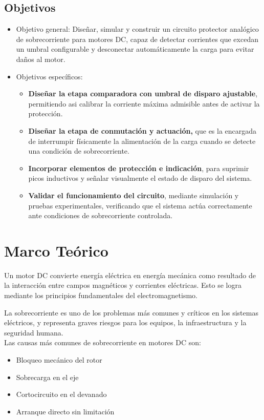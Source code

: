 \documentclass[conference]{IEEEtran}
\begin{document}
\subsection{Objetivos}
\begin{itemize}
    \item Objetivo general: Diseñar, simular y construir un circuito protector analógico de sobrecorriente para motores DC, capaz de detectar corrientes que excedan un umbral configurable y desconectar automáticamente la carga para evitar daños al motor.\\
    \item Objetivos específicos:
    \begin{itemize}
        \item \textbf{Diseñar la etapa comparadora con umbral de disparo ajustable}, permitiendo asi calibrar la corriente máxima admisible antes de activar la protección.
        \item \textbf{Diseñar la etapa de conmutación y actuación,} que es la encargada de interrumpir físicamente la alimentación de la carga cuando se detecte una condición de sobrecorriente.
        \item \textbf{Incorporar elementos de protección e indicación}, para suprimir picos inductivos y señalar visualmente el estado de disparo del sistema.
        \item \textbf{Validar el funcionamiento del circuito}, mediante simulación y pruebas experimentales, verificando que el sistema actúa correctamente ante condiciones de sobrecorriente controlada.
    \end{itemize}
\end{itemize}

\section{Marco Teórico}

Un motor DC convierte energía eléctrica en energía mecánica como resultado de la interacción entre campos magnéticos y corrientes eléctricas. Esto se logra mediante los principios fundamentales del electromagnetismo.

La sobrecorriente es uno de los problemas más comunes y críticos en los sistemas eléctricos, y representa graves riesgos para los equipos, la infraestructura y la seguridad humana.\\

Las causas más comunes de sobrecorriente en motores DC son: 

\begin{itemize}
	\item Bloqueo mecánico del rotor
	\item Sobrecarga en el eje
	\item Cortocircuito en el devanado
	\item Arranque directo sin limitación\\
\end{itemize}
\end{document}
